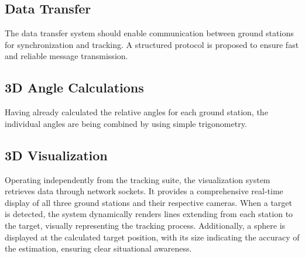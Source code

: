 
\subsection{Data Transfer}

The data transfer system should enable communication between ground stations for synchronization and tracking. A structured protocol is proposed to ensure fast and reliable message transmission.

\subsection{3D Angle Calculations}
Having already calculated the relative angles for each ground station, the individual angles are being combined by using simple trigonometry. 



\subsection{3D Visualization}
Operating independently from the tracking suite, the visualization system retrieves data through network sockets. It provides a comprehensive real-time display of all three ground stations and their respective cameras. When a target is detected, the system dynamically renders lines extending from each station to the target, visually representing the tracking process. Additionally, a sphere is displayed at the calculated target position, with its size indicating the accuracy of the estimation, ensuring clear situational awareness.
